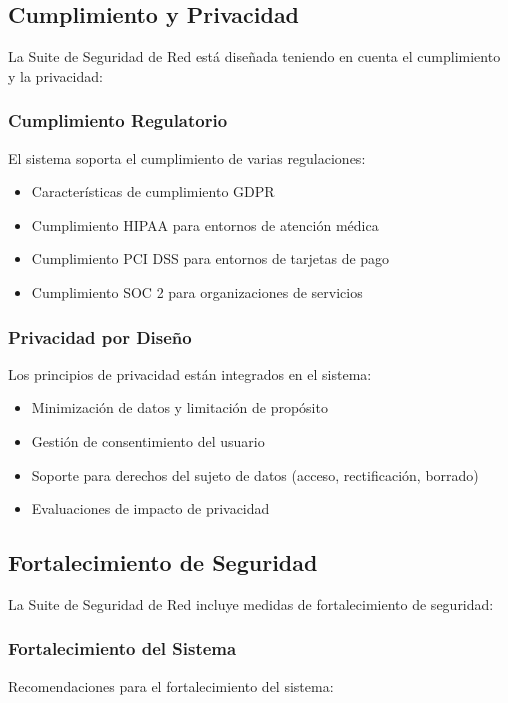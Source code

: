 \subsection{Cumplimiento y Privacidad}
La Suite de Seguridad de Red está diseñada teniendo en cuenta el cumplimiento y la privacidad:

\subsubsection{Cumplimiento Regulatorio}
El sistema soporta el cumplimiento de varias regulaciones:

\begin{itemize}
    \item Características de cumplimiento GDPR
    \item Cumplimiento HIPAA para entornos de atención médica
    \item Cumplimiento PCI DSS para entornos de tarjetas de pago
    \item Cumplimiento SOC 2 para organizaciones de servicios
\end{itemize}

\subsubsection{Privacidad por Diseño}
Los principios de privacidad están integrados en el sistema:

\begin{itemize}
    \item Minimización de datos y limitación de propósito
    \item Gestión de consentimiento del usuario
    \item Soporte para derechos del sujeto de datos (acceso, rectificación, borrado)
    \item Evaluaciones de impacto de privacidad
\end{itemize}

\subsection{Fortalecimiento de Seguridad}
La Suite de Seguridad de Red incluye medidas de fortalecimiento de seguridad:

\subsubsection{Fortalecimiento del Sistema}
Recomendaciones para el fortalecimiento del sistema:

